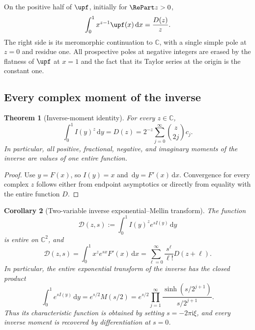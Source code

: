 \documentclass[11pt,oneside]{article}
\newtheorem{theorem}{Theorem}[section]
\newtheorem{corollary}[theorem]{Corollary}
\theoremstyle{definition}
\theoremstyle{remark}
\newcommand{\C}{\mathbb C}
\newcommand{\dd}{\,\mathrm d}
\newcommand{\ii}{\mathrm i}
\newcommand{\1}{\mathbf 1}
\begin{document}
On the positive half of \(\upf\), initially for \(\RePart z>0\),
\begin{equation}
 \int_0^1x^{z-1}\upf(x)\dd x=\frac{D(z)}{z}.             \label{p6:eq:up-mellin}
\end{equation}
The right side is its meromorphic continuation to \(\C\), with a single simple pole at
\(z=0\) and residue one.  All prospective poles at negative integers are erased by the
flatness of \(\upf\) at \(x=1\) and the fact that its Taylor series at the origin is the
constant one.

\subsection{Every complex moment of the inverse}

\begin{theorem}[Inverse-moment identity]
\label{p6:thm:inverse-mellin}
For every \(z\in\C\),
\begin{equation}
 \boxed{
 \int_0^1I(y)^z\dd y=D(z)
 =2^{-z}\sum_{j=0}^{\infty}\binom z{2j}c_j.
 }                                                        \label{p6:eq:inverse-mellin}
\end{equation}
In particular, all positive, fractional, negative, and imaginary moments of the inverse
are values of one entire function.
\end{theorem}

\begin{proof}
Use \(y=F(x)\), so \(I(y)=x\) and \(\dd y=F'(x)\dd x\).  Convergence for every
complex \(z\) follows either from endpoint asymptotics or directly from equality with the
entire function \(D\).
\end{proof}

\begin{corollary}[Two-variable inverse exponential--Mellin transform]
\label{p6:cor:inverse-two-variable-transform}
The function
\begin{equation}
 \mathcal D(z,s):=\int_0^1 I(y)^z e^{sI(y)}\dd y             \label{p6:eq:D-two-variable-def}
\end{equation}
is entire on \(\C^2\), and
\begin{equation}
 \boxed{
 \mathcal D(z,s)=\int_0^1x^ze^{sx}F'(x)\dd x
 =\sum_{\ell=0}^{\infty}\frac{s^\ell}{\ell!}D(z+\ell).
 }                                                          \label{p6:eq:D-two-variable-series}
\end{equation}
In particular, the entire exponential transform of the inverse has the closed product
\begin{equation}
 \boxed{
 \int_0^1e^{sI(y)}\dd y=e^{s/2}M(s/2)
 =e^{s/2}\prod_{j=1}^{\infty}
   \frac{\sinh(s/2^{j+1})}{s/2^{j+1}}.
 }                                                          \label{p6:eq:inverse-exponential-transform}
\end{equation}
Thus its characteristic function is obtained by setting \(s=-2\pi\ii\xi\), and every
inverse moment is recovered by differentiation at \(s=0\).
\end{corollary}
\end{document}
